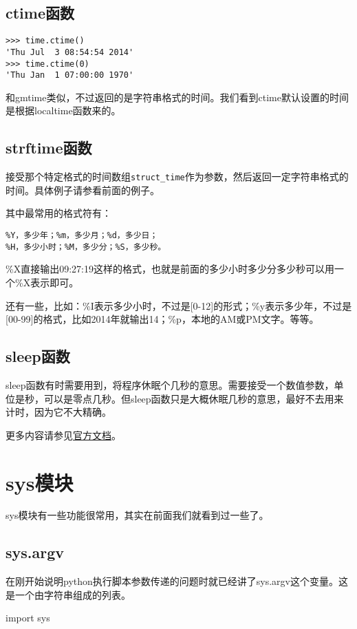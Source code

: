 \documentclass[12pt,oneside]{book}
\begin{document}
\begin{common-format}
\section{ctime函数}
\begin{Verbatim}
>>> time.ctime()
'Thu Jul  3 08:54:54 2014'
>>> time.ctime(0)
'Thu Jan  1 07:00:00 1970'
\end{Verbatim}
和gmtime类似，不过返回的是字符串格式的时间。我们看到ctime默认设置的时间是根据localtime函数来的。


\section{strftime函数}
接受那个特定格式的时间数组\verb+struct_time+作为参数，然后返回一定字符串格式的时间。具体例子请参看前面的例子。

其中最常用的格式符有：
\begin{Verbatim}
%Y，多少年；%m，多少月；%d，多少日；
%H，多少小时；%M，多少分；%S，多少秒。
\end{Verbatim}

\%{}X直接输出09:27:19这样的格式，也就是前面的多少小时多少分多少秒可以用一个\%{}X表示即可。

还有一些，比如：\%{}I表示多少小时，不过是[0-12]的形式；\%{}y表示多少年，不过是[00-99]的格式，比如2014年就输出14；\%{}p，本地的AM或PM文字。等等。


\section{sleep函数 }
sleep函数有时需要用到，将程序休眠个几秒的意思。需要接受一个数值参数，单位是秒，可以是零点几秒。但sleep函数只是大概休眠几秒的意思，最好不去用来计时，因为它不大精确。



\begin{large}
更多内容请参见\href{https://docs.python.org/3/library/time.html}{官方文档}。
\end{large}


\chapter{sys模块}
sys模块有一些功能很常用，其实在前面我们就看到过一些了。

\section{sys.argv}
在刚开始说明python执行脚本参数传递的问题时就已经讲了sys.argv这个变量。这是一个由字符串组成的列表。
\begin{tcbpython}
import sys


\end{tcbpython}
\end{common-format}
\end{document}
